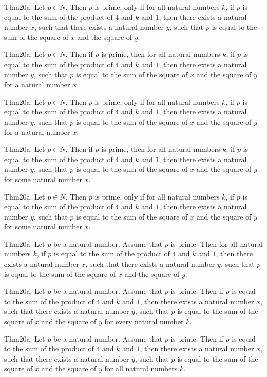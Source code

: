 \documentclass{article}
\begin{document}
Thm20a. Let $p \in N$. Then $p$ is prime, only if for all natural numbers $k$, if $p$ is equal to the sum of the product of $4$ and $k$ and $1$, then there exists a natural number $x$, such that there exists a natural number $y$, such that $p$ is equal to the sum of the square of $x$ and the square of $y$.

Thm20a. Let $p \in N$. Then if $p$ is prime, then for all natural numbers $k$, if $p$ is equal to the sum of the product of $4$ and $k$ and $1$, then there exists a natural number $y$, such that $p$ is equal to the sum of the square of $x$ and the square of $y$ for a natural number $x$.

Thm20a. Let $p \in N$. Then $p$ is prime, only if for all natural numbers $k$, if $p$ is equal to the sum of the product of $4$ and $k$ and $1$, then there exists a natural number $y$, such that $p$ is equal to the sum of the square of $x$ and the square of $y$ for a natural number $x$.

Thm20a. Let $p \in N$. Then if $p$ is prime, then for all natural numbers $k$, if $p$ is equal to the sum of the product of $4$ and $k$ and $1$, then there exists a natural number $y$, such that $p$ is equal to the sum of the square of $x$ and the square of $y$ for some natural number $x$.

Thm20a. Let $p \in N$. Then $p$ is prime, only if for all natural numbers $k$, if $p$ is equal to the sum of the product of $4$ and $k$ and $1$, then there exists a natural number $y$, such that $p$ is equal to the sum of the square of $x$ and the square of $y$ for some natural number $x$.

Thm20a. Let $p$ be a natural number. Assume that $p$ is prime. Then for all natural numbers $k$, if $p$ is equal to the sum of the product of $4$ and $k$ and $1$, then there exists a natural number $x$, such that there exists a natural number $y$, such that $p$ is equal to the sum of the square of $x$ and the square of $y$.

Thm20a. Let $p$ be a natural number. Assume that $p$ is prime. Then if $p$ is equal to the sum of the product of $4$ and $k$ and $1$, then there exists a natural number $x$, such that there exists a natural number $y$, such that $p$ is equal to the sum of the square of $x$ and the square of $y$ for every natural number $k$.

Thm20a. Let $p$ be a natural number. Assume that $p$ is prime. Then if $p$ is equal to the sum of the product of $4$ and $k$ and $1$, then there exists a natural number $x$, such that there exists a natural number $y$, such that $p$ is equal to the sum of the square of $x$ and the square of $y$ for all natural numbers $k$.
\end{document}
